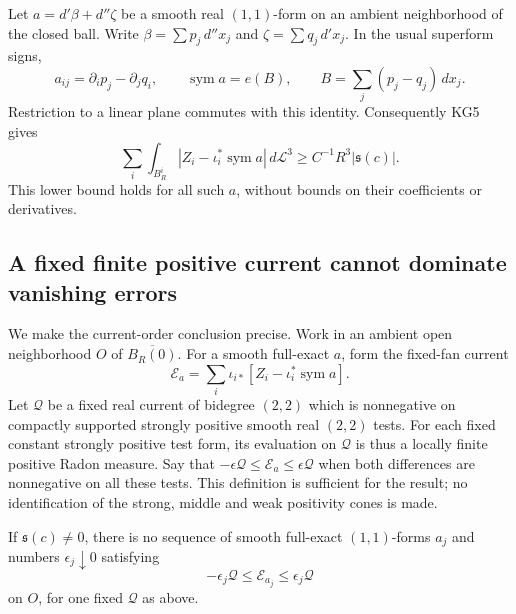 Let \(a=d'\beta+d''\zeta\) be a smooth real \((1,1)\)-form
on an ambient neighborhood of the closed ball.  Write
\(\beta=\sum p_j\,d''x_j\) and
\(\zeta=\sum q_j\,d'x_j\).  In the usual superform signs,
\[
 a_{ij}=\partial_i p_j-\partial_j q_i,
 \qquad
 \operatorname{sym}a=e(B),
       \qquad B=\sum_j(p_j-q_j)\,dx_j.
 \tag{KG10}
\]
Restriction to a linear plane commutes with this identity.
Consequently KG5 gives
\[
 \sum_i\int_{B_R^i}
       |Z_i-\iota_i^*\operatorname{sym}a|\,d\mathcal L^3
                    \geq C^{-1}R^3|\mathfrak s(c)|.
 \tag{KG11}
\]
This lower bound holds for all such \(a\), without bounds
on their coefficients or derivatives.

\subsection{A fixed finite positive current cannot dominate vanishing errors}

We make the current-order conclusion precise.  Work in an
ambient open neighborhood \(O\) of \(\overline{B_R(0)}\).
For a smooth full-exact \(a\), form the fixed-fan current
\[
 \mathcal E_a=\sum_i\iota_{i*}
       [Z_i-\iota_i^*\operatorname{sym}a].
 \tag{KG12}
\]
Let \(\mathcal Q\) be a fixed real current of bidegree
\((2,2)\) which is nonnegative on compactly supported
strongly positive smooth real \((2,2)\) tests.  For each
fixed constant strongly positive test form, its evaluation
on \(\mathcal Q\) is thus a locally finite positive Radon
measure.  Say that
\(-\epsilon\mathcal Q\leq\mathcal E_a\leq
\epsilon\mathcal Q\) when both differences are
nonnegative on all these tests.  This definition is sufficient
for the result; no identification of the strong, middle and
weak positivity cones is made.

\begin{corollary}
\label{cor:r13-no-fixed-control-on-supplied-five-plane-fan}
If \(\mathfrak s(c)\ne0\), there is no sequence of smooth
full-exact \((1,1)\)-forms \(a_j\) and numbers
\(\epsilon_j\downarrow0\) satisfying
\[
             -\epsilon_j\mathcal Q\leq\mathcal E_{a_j}
                                      \leq\epsilon_j\mathcal Q
 \tag{KG13}
\]
on \(O\), for one fixed \(\mathcal Q\) as above.
\end{corollary}

